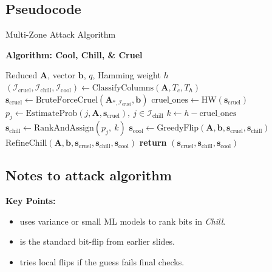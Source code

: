 \documentclass{beamer}
\begin{document}
\subsection*{Pseudocode}
\begin{frame}{Multi-Zone Attack Algorithm}

\textbf{Algorithm: Cool, Chill, \& Cruel}
\small
\begin{algorithm}[H]
\caption{\small Multi-Zone Recovery}
\label{alg:ccc-attack}
\begin{algorithmic}[1]
\Require Reduced $\mathbf{A}$, vector $\mathbf{b}$, $q$, Hamming weight $h$
\State $(\mathcal{I}_{\mathrm{cruel}},\mathcal{I}_{\mathrm{chill}},\mathcal{I}_{\mathrm{cool}}) \gets \text{ClassifyColumns}(\mathbf{A}, T_c, T_h)$
\State $\mathbf{s}_{\mathrm{cruel}} \gets \mathrm{BruteForceCruel}(\mathbf{A}_{*,\mathcal{I}_{\mathrm{cruel}}}, \mathbf{b})$
\State $\mathrm{cruel\_ones} \gets \mathrm{HW}(\mathbf{s}_{\mathrm{cruel}})$
\State $p_j \gets \mathrm{EstimateProb}(j,\mathbf{A},\mathbf{s}_{\mathrm{cruel}}),\ j\in \mathcal{I}_{\mathrm{chill}}$
\State $k \gets h - \mathrm{cruel\_ones}$
\State $\mathbf{s}_{\mathrm{chill}} \gets \mathrm{RankAndAssign}(p_j,\ k)$
\State $\mathbf{s}_{\mathrm{cool}} \gets \mathrm{GreedyFlip}(\mathbf{A},\mathbf{b},\mathbf{s}_{\mathrm{cruel}},\mathbf{s}_{\mathrm{chill}})$
\State $\mathrm{RefineChill}(\mathbf{A},\mathbf{b},\mathbf{s}_{\mathrm{cruel}},\mathbf{s}_{\mathrm{chill}},\mathbf{s}_{\mathrm{cool}})$
\State \textbf{return} $(\mathbf{s}_{\mathrm{cruel}}, \mathbf{s}_{\mathrm{chill}}, \mathbf{s}_{\mathrm{cool}})$
\end{algorithmic}
\end{algorithm}

\end{frame}

\subsection*{Notes to attack algorithm}

\begin{frame}
\textbf{Key Points:}
\begin{itemize}
  \item {} uses variance or small ML models to rank bits in \emph{Chill}.
  \item {} is the standard bit-flip from earlier slides.
  \item {} tries local flips if the guess fails final checks.
\end{itemize}
\end{frame}
\end{document}
